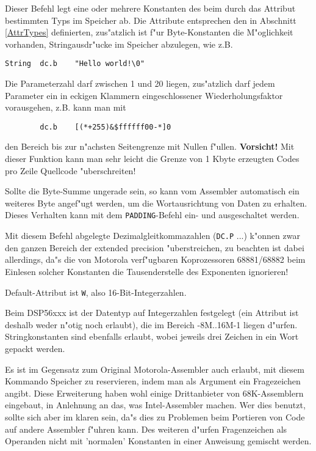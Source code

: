 \documentclass[12pt,a4paper,twoside]{report}
\newcommand{\bb}[1]{{\bf #1}}
\newcommand{\tty}[1]{{\tt #1}}
\begin{document}
{Dieser Befehl legt eine oder mehrere Konstanten des beim durch
das Attribut bestimmten Typs im Speicher ab.  Die Attribute entsprechen
den in Abschnitt \ref{AttrTypes} definierten, zus"atzlich ist f"ur
Byte-Konstanten die M"oglichkeit vorhanden, Stringausdr"ucke im Speicher
abzulegen, wie z.B.
\begin{verbatim}
String  dc.b    "Hello world!\0"
\end{verbatim}
Die Parameterzahl darf zwischen 1 und 20 liegen, zus"atzlich darf jedem
Parameter ein in eckigen Klammern eingeschlossener Wiederholungsfaktor
vorausgehen, z.B. kann man mit
\begin{verbatim}
        dc.b    [(*+255)&$ffffff00-*]0
\end{verbatim}
den Bereich bis zur n"achsten Seitengrenze mit Nullen f"ullen.
\bb{Vorsicht!}
Mit dieser Funktion kann man sehr leicht die Grenze von 1 Kbyte erzeugten
Codes pro Zeile Quellcode "uberschreiten!
\par
Sollte die Byte-Summe ungerade sein, so kann vom Assembler automatisch
ein weiteres Byte angef"ugt werden, um die Wortausrichtung von Daten zu
erhalten.  Dieses Verhalten kann mit dem \tty{PADDING}-Befehl ein-
und ausgeschaltet werden.
\par
Mit diesem Befehl abgelegte Dezimalgleitkommazahlen (\tty{DC.P} ...) k"onnen
zwar den ganzen Bereich der extended precision "uberstreichen, zu beachten
ist dabei allerdings, da"s die von Motorola verf"ugbaren Koprozessoren
68881/68882 beim Einlesen solcher Konstanten die Tausenderstelle des
Exponenten ignorieren!
\par
Default-Attribut ist \tty{W}, also 16-Bit-Integerzahlen.
\par
Beim DSP56xxx ist der Datentyp auf Integerzahlen festgelegt (ein
Attribut ist deshalb weder n"otig noch erlaubt), die im Bereich
-8M..16M-1 liegen d"urfen.   Stringkonstanten sind ebenfalls erlaubt,
wobei jeweils drei Zeichen in ein Wort gepackt werden.
\par
Es ist im Gegensatz zum Original Motorola-Assembler auch erlaubt, mit
diesem Kommando Speicher zu reservieren, indem man als Argument ein
Fragezeichen angibt.  Diese Erweiterung haben wohl einige Drittanbieter
von 68K-Assemblern eingebaut, in Anlehnung an das, was Intel-Assembler
machen.  Wer dies benutzt, sollte sich aber im klaren sein, da"s dies
zu Problemen beim Portieren von Code auf andere Assembler f"uhren kann. 
Des weiteren d"urfen Fragenzeichen als Operanden nicht mit 'normalen'
Konstanten in einer Anweisung gemischt werden.

}
\end{document}
